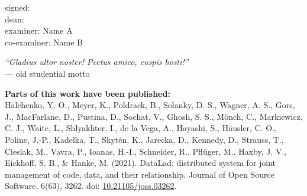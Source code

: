 \documentclass[english,12pt]{report}
\begin{document}
\begin{spacing}{1.5}
\vspace*{\fill}
\noindent signed:\\
dean:\\
examiner: Name A\\
co-examiner: Name B



\newpage

\begin{center}
\null{}
    \textit{``Gladius ultor noster! Pectus amico, cuspis hosti!''}\\
    \hspace{0.3\textwidth} --- old studential motto
\null
\end{center}




\newpage


\vspace*{\fill}

\noindent \textbf{Parts of this work have been published:}\\

\noindent
%
Halchenko, Y. O.,
Meyer, K.,
Poldrack, B.,
Solanky, D. S.,
Wagner, A. S.,
Gors, J.,
MacFarlane, D.,
Pustina, D.,
Sochat, V.,
Ghosh, S. S.,
Mönch, C.,
Markiewicz, C. J.,
Waite, L.,
Shlyakhter, I.,
de la Vega, A.,
Hayashi, S.,
Häusler, C. O.,
Poline, J.-P.,
Kadelka, T.,
Skytén, K.,
Jarecka, D.,
Kennedy, D.,
Strauss, T.,
Cieslak, M.,
Vavra, P.,
Ioanas, H.-I.,
Schneider, R.,
Pflüger, M.,
Haxby, J. V.,
Eickhoff, S. B.,
\& Hanke, M.
%
(2021).
%
DataLad: distributed system for joint management of code, data, and their
relationship.
%
Journal of Open Source Software, 6(63), 3262.
%
doi: \href{https://doi.org/10.21105/joss.03262} {10.21105/joss.03262}.\\


\end{spacing}
\end{document}
